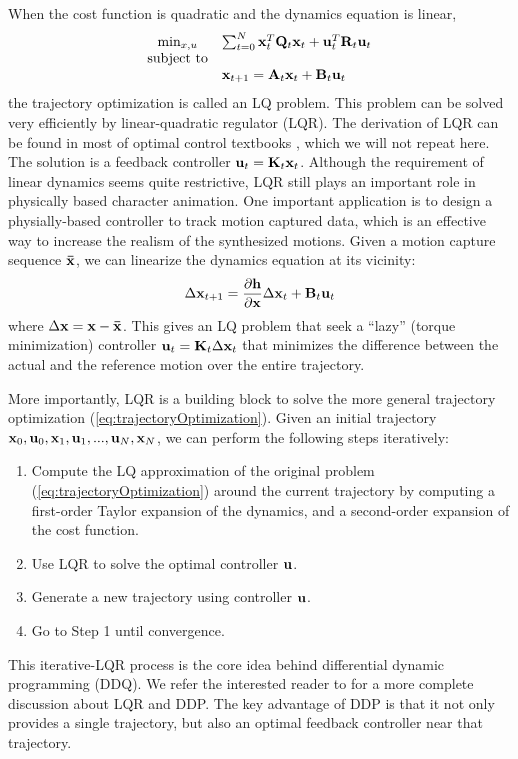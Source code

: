 When the cost function is quadratic and the dynamics equation is linear,
\begin{equation}
  \begin{array}{cl}
    \min_{x,u}&\sum_{t=0}^{N}\vc{x}_t^T\vc{Q}_t\vc{x}_t+\vc{u}_t^T\vc{R}_t\vc{u}_t\\
    \textrm{subject to}&\\
    &\vc{x}_{t+1}=\vc{A}_t\vc{x}_t+\vc{B}_t\vc{u}_t
  \end{array}
  \label{eq:LQR}
\end{equation}
the trajectory optimization is called an LQ problem. This problem can be solved very efficiently by linear-quadratic regulator (LQR). The derivation of LQR can be found in most of optimal control textbooks \cite{todorov2006optimal}, which we will not repeat here. The solution is a feedback controller $\mathbf{u}_t=\mathbf{K}_t\mathbf{x}_t$. Although the requirement of linear dynamics seems quite restrictive, LQR still plays an important role in physically based character animation. One important application is to design a physially-based controller to track motion captured data, which is an effective way to increase the realism of the synthesized motions. Given a motion capture sequence $\mathbf{\bar{x}}$, we can linearize the dynamics equation at its vicinity:
\begin{displaymath}
  \Delta \mathbf{x}_{t+1}=\frac{\partial \mathbf{h}}{\partial \mathbf{x}}\Delta \mathbf{x}_{t}+\mathbf{B}_t\mathbf{u}_t
  \end{displaymath}
where $\Delta \mathbf{x}=\mathbf{x}-\mathbf{\bar{x}}$. This gives an LQ problem that seek a ``lazy'' (torque minimization) controller $\mathbf{u}_t=\mathbf{K}_t\Delta \mathbf{x}_t$ that minimizes the difference between the actual and the reference motion over the entire trajectory.

More importantly, LQR is a building block to solve the more general trajectory optimization (\ref{eq:trajectoryOptimization}). Given an initial trajectory $\mathbf{x}_0, \mathbf{u}_0, \mathbf{x}_1, \mathbf{u}_1, ... , \mathbf{u}_N, \mathbf{x}_N$, we can perform the following steps iteratively:
\begin{enumerate}
\item{Compute the LQ approximation of the original problem (\ref{eq:trajectoryOptimization}) around the current trajectory by computing a first-order Taylor expansion of the dynamics, and a second-order expansion of the cost function.}
\item{Use LQR to solve the optimal controller $\mathbf{u}$.}
\item{Generate a new trajectory using controller $\mathbf{u}$.}
  \item{Go to Step 1 until convergence.}
\end{enumerate}
This iterative-LQR process is the core idea behind differential dynamic programming (DDQ). We refer the interested reader to \cite{todorov2006optimal} for a more complete discussion about LQR and DDP. The key advantage of DDP is that it not only provides a single trajectory, but also an optimal feedback controller near that trajectory.

